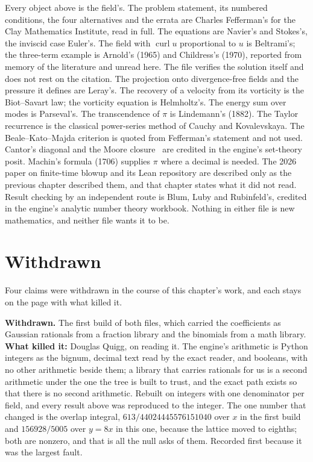Every object above is the field's. The problem statement, its numbered conditions, the four
alternatives and the errata are Charles Fefferman's for the Clay Mathematics Institute, read in full.
The equations are Navier's and Stokes's, the inviscid case Euler's. The field with
$\operatorname{curl}u$ proportional to $u$ is Beltrami's; the three-term example is Arnold's (1965)
and Childress's (1970), reported from memory of the literature and unread here. The file verifies
the solution itself and does not rest on the citation. The projection onto divergence-free fields and
the pressure it defines are Leray's. The recovery of a velocity from its vorticity is the Biot--Savart
law; the vorticity equation is Helmholtz's. The energy sum over modes is Parseval's. The
transcendence of $\pi$ is Lindemann's (1882). The Taylor recurrence is the classical power-series
method of Cauchy and Kovalevskaya. The Beale--Kato--Majda criterion is quoted from Fefferman's
statement and not used. Cantor's diagonal and the Moore closure~\cite{src:Moore-1910} are credited in the engine's
set-theory posit. Machin's formula (1706) supplies $\pi$ where a decimal is needed. The 2026 paper on
finite-time blowup and its Lean repository are described only as the previous chapter described them,
and that chapter states what it did not read. Result checking by an independent route is Blum, Luby
and Rubinfeld's, credited in the engine's analytic number theory workbook. Nothing in either file is
new mathematics, and neither file wants it to be.

\section{Withdrawn}

Four claims were withdrawn in the course of this chapter's work, and each stays on the page with what
killed it.

\textbf{Withdrawn.} The first build of both files, which carried the coefficients as Gaussian
rationals from a fraction library and the binomials from a math library. \textbf{What killed it:}
Douglas Quigg, on reading it. The engine's arithmetic is Python integers as the bignum, decimal text
read by the exact reader, and booleans, with no other arithmetic beside them; a library that carries
rationals for us is a second arithmetic under the one the tree is built to trust, and the exact path
exists so that there is no second arithmetic. Rebuilt on integers with one denominator per field, and
every result above was reproduced to the integer. The one number that changed is the overlap
integral, $613/44024445576151040$ over $x$ in the first build and $156928/5005$ over $y = 8x$ in this
one, because the lattice moved to eighths; both are nonzero, and that is all the null asks of them.
Recorded first because it was the largest fault.

